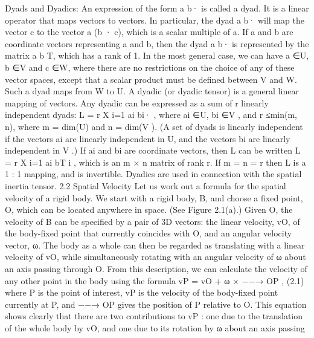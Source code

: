 Dyads and Dyadics: An expression of the form a b· is called a dyad. It is a linear operator that maps vectors to vectors. In particular, the dyad a b· will map the vector c to the vector a (b · c), which is a scalar multiple of a. If a and b are coordinate vectors representing a and b, then the dyad a b· is represented by the matrix a b T, which has a rank of 1. In the most general case, we can have a ∈U, b ∈V and c ∈W, where there are no restrictions on the choice of any of these vector spaces, except that a scalar product must be defined between V and W. Such a dyad maps from W to U. A dyadic (or dyadic tensor) is a general linear mapping of vectors. Any dyadic can be expressed as a sum of r linearly independent dyads: L = r X i=1 ai bi· , where ai ∈U, bi ∈V , and r ≤min(m, n), where m = dim(U) and n = dim(V ). (A set of dyads is linearly independent if the vectors ai are linearly independent in U, and the vectors bi are linearly independent in V .) If ai and bi are coordinate vectors, then L can be written L = r X i=1 ai bT i , which is an m × n matrix of rank r. If m = n = r then L is a 1 : 1 mapping, and is invertible. Dyadics are used in connection with the spatial inertia tensor. 2.2 Spatial Velocity Let us work out a formula for the spatial velocity of a rigid body. We start with a rigid body, B, and choose a fixed point, O, which can be located anywhere in space. (See Figure 2.1(a).) Given O, the velocity of B can be specified by a pair of 3D vectors: the linear velocity, vO, of the body-fixed point that currently coincides with O, and an angular velocity vector, ω. The body as a whole can then be regarded as translating with a linear velocity of vO, while simultaneously rotating with an angular velocity of ω about an axis passing through O. From this description, we can calculate the velocity of any other point in the body using the formula vP = vO + ω × −−→ OP , (2.1) where P is the point of interest, vP is the velocity of the body-fixed point currently at P, and −−→ OP gives the position of P relative to O. This equation shows clearly that there are two contributions to vP : one due to the translation of the whole body by vO, and one due to its rotation by ω about an axis passing


